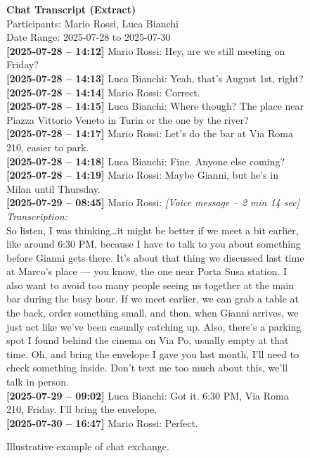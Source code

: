 \begin{figure}[htbp]
\centering
\begin{minipage}{0.92\linewidth}
\small
\textbf{Chat Transcript (Extract)}\\
Participants: Mario Rossi, Luca Bianchi\\
Date Range: 2025-07-28 to 2025-07-30\\[0.5em]
\textbf{[2025-07-28 -- 14:12]}  Mario Rossi: Hey, are we still meeting on Friday?\\
\textbf{[2025-07-28 -- 14:13]} Luca Bianchi: Yeah, that's August 1st, right?\\
\textbf{[2025-07-28 -- 14:14]}  Mario Rossi: Correct.\\
\textbf{[2025-07-28 -- 14:15]} Luca Bianchi: Where though? The place near Piazza Vittorio Veneto in Turin or the one by the river?\\
\textbf{[2025-07-28 -- 14:17]}  Mario Rossi: Let's do the bar at Via Roma 210, easier to park.\\
\textbf{[2025-07-28 -- 14:18]} Luca Bianchi: Fine. Anyone else coming?\\
\textbf{[2025-07-28 -- 14:19]}  Mario Rossi: Maybe Gianni, but he's in Milan until Thursday.\\[0.5em]
\textbf{[2025-07-29 -- 08:45]}  Mario Rossi: \textit{[Voice message -- 2 min 14 sec]}\\
\quad \textit{Transcription:}\\
\quad So listen, I was thinking\dots it might be better if we meet a bit earlier, like around 6:30 PM, because I have to talk to you about something before Gianni gets there. It's about that thing we discussed last time at Marco's place — you know, the one near Porta Susa station. I also want to avoid too many people seeing us together at the main bar during the busy hour. If we meet earlier, we can grab a table at the back, order something small, and then, when Gianni arrives, we just act like we've been casually catching up. Also, there's a parking spot I found behind the cinema on Via Po, usually empty at that time. Oh, and bring the envelope I gave you last month, I'll need to check something inside. Don't text me too much about this, we'll talk in person.\\[0.5em]
\textbf{[2025-07-29 -- 09:02]} Luca Bianchi: Got it. 6:30 PM, Via Roma 210, Friday. I'll bring the envelope.\\
\textbf{[2025-07-30 -- 16:47]}  Mario Rossi: Perfect.
\end{minipage}
\caption{Illustrative example of chat exchange.}
\label{fig:chat-investigation-example}
\end{figure}


